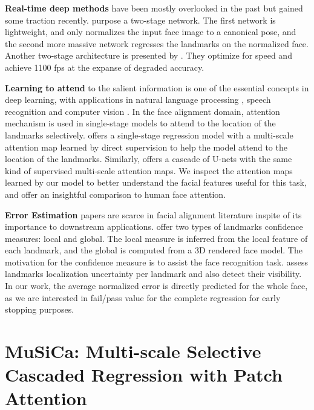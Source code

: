 \documentclass[twocolumn]{article}
\begin{document}
\textbf{Real-time deep methods} have been mostly overlooked in the past but gained some traction recently. \cite{liu2019efficient} purpose a two-stage network. The first network is lightweight, and only normalizes the input face image to a canonical pose, and the second more massive network regresses the landmarks on the normalized face. Another two-stage architecture is presented by \cite{duan2019faster}. They optimize for speed and achieve 1100 fps at the expanse of degraded accuracy. 

\textbf{Learning to attend} to the salient information is one of the essential concepts in deep learning, with applications in natural language processing \cite{wang2016attention, vaswani2017attention}, speech recognition \cite{chorowski2015attention, bahdanau2016end} and computer vision \cite{you2016image, mnih2014recurrent, parmar2019stand}. In the face alignment domain, attention mechanism is used in single-stage models to attend to the location of the landmarks selectively. \cite{yue2018attentional} offers a single-stage regression model with a multi-scale attention map learned by direct supervision to help the model attend to the location of the landmarks. Similarly, \cite{dapogny2019decafa} offers a cascade of U-nets with the same kind of supervised multi-scale attention maps. We inspect the attention maps learned by our model to better understand the facial features useful for this task, and offer an insightful comparison to human face attention.


\textbf{Error Estimation} papers are scarce in facial alignment literature inspite of its importance to downstream applications. \cite{kim2017local} offer two types of landmarks confidence measures: local and global. The local measure is inferred from the local feature of each landmark, and the global is computed from a 3D rendered face model. The motivation for the confidence measure is to assist the face recognition task. \cite{kumar2020luvli} assess landmarks localization uncertainty per landmark and also detect their visibility. In our work, the average normalized error is directly predicted for the whole face, as we are interested in fail/pass value for the complete regression for early stopping purposes.



\section{MuSiCa: Multi-scale Selective Cascaded Regression with Patch Attention}
\end{document}
